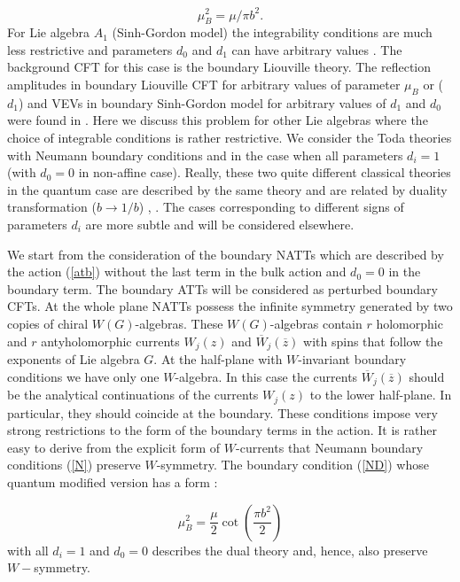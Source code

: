 \documentclass[a4paper,12pt]{article}
\begin{document}
\begin{equation}
\mu _B^2=\mu /\pi b^2.  \label{ND}
\end{equation}
For Lie algebra $A_1$ (Sinh-Gordon model) the integrability conditions are
much less restrictive and parameters $d_0$ and $d_1$ can have arbitrary
values \cite{GZ}. The background CFT for this case is the boundary Liouville
theory. The reflection amplitudes in boundary Liouville CFT for arbitrary
values of parameter $\mu _B$ or ($d_1$) and VEVs in boundary 
Sinh-Gordon model for
arbitrary values of $d_1$ and $d_0$ were found in \cite{FZZA} .
Here we discuss this problem for other Lie algebras where the choice of
integrable conditions is rather restrictive. We consider the Toda theories
with Neumann boundary conditions and in the case when all parameters $d_i=1$
(with $d_0=0$ in non-affine case). Really, these two quite different
classical theories in the quantum case are described by the same
theory and are related by duality transformation ($b\rightarrow 1/b$)
\cite{CRG}, \cite{GHB}. The
cases corresponding to different signs of parameters $d_i$ are more subtle
and will be considered elsewhere.

We start from the consideration of the boundary NATTs which are described by
the action (\ref{atb}) without the last term in the bulk action and $d_0=0$
in the boundary term. The boundary ATTs will be considered as perturbed
boundary CFTs.  At the whole plane NATTs possess the
infinite symmetry generated by two copies of chiral $W(G)$-algebras. These 
$ W(G)$-algebras contain $r$ holomorphic and $r$ antyholomorphic currents 
$W_j(z)$ and $\overline{W}_j(\overline{z})$ with spins that follow the
exponents of Lie algebra $G.$ At the half-plane with $W$-invariant boundary
conditions we have only one $W$-algebra. In this case the currents 
$\overline{W}_j(\overline{z})$ should be the analytical continuations of the
currents $W_j(z)$ to the lower half-plane. In particular, they should
coincide at the boundary. These conditions impose very strong restrictions
to the form of the boundary terms in the action. It is rather easy to derive
from the explicit form of $W$-currents \cite{FL} that Neumann boundary
conditions (\ref{N}) preserve $W$-symmetry. The boundary condition (\ref{ND}) 
whose quantum modified version has a form \cite{FZZA}:

\begin{equation}
\mu _B^2=\frac \mu 2\cot \left( \frac{\pi b^2}2\right)
\label{MND}
\end{equation}
with all $d_i=1$ and $d_0=0$ describes the dual theory and, hence, 
also preserve $W-$symmetry. 
\end{document}
